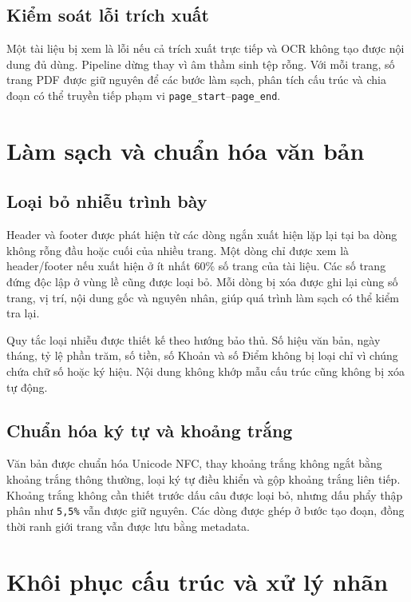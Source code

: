 \documentclass[12pt,a4paper]{article}
\newcommand{\code}[1]{\texttt{#1}}
\begin{document}
\subsection{Kiểm soát lỗi trích xuất}

Một tài liệu bị xem là lỗi nếu cả trích xuất trực tiếp và OCR không tạo được nội
dung đủ dùng. Pipeline dừng thay vì âm thầm sinh tệp rỗng. Với mỗi trang, số trang
PDF được giữ nguyên để các bước làm sạch, phân tích cấu trúc và chia đoạn có thể
truyền tiếp phạm vi \code{page\_start}--\code{page\_end}.

\section{Làm sạch và chuẩn hóa văn bản}

\subsection{Loại bỏ nhiễu trình bày}

Header và footer được phát hiện từ các dòng ngắn xuất hiện lặp lại tại ba dòng
không rỗng đầu hoặc cuối của nhiều trang. Một dòng chỉ được xem là header/footer
nếu xuất hiện ở ít nhất 60\% số trang của tài liệu. Các số trang đứng độc lập ở
vùng lề cũng được loại bỏ. Mỗi dòng bị xóa được ghi lại cùng số trang, vị trí,
nội dung gốc và nguyên nhân, giúp quá trình làm sạch có thể kiểm tra lại.

Quy tắc loại nhiễu được thiết kế theo hướng bảo thủ. Số hiệu văn bản, ngày tháng,
tỷ lệ phần trăm, số tiền, số Khoản và số Điểm không bị loại chỉ vì chúng chứa
chữ số hoặc ký hiệu. Nội dung không khớp mẫu cấu trúc cũng không bị xóa tự động.

\subsection{Chuẩn hóa ký tự và khoảng trắng}

Văn bản được chuẩn hóa Unicode NFC, thay khoảng trắng không ngắt bằng khoảng
trắng thông thường, loại ký tự điều khiển và gộp khoảng trắng liên tiếp. Khoảng
trắng không cần thiết trước dấu câu được loại bỏ, nhưng dấu phẩy thập phân như
\code{5,5\%} vẫn được giữ nguyên. Các dòng được ghép ở bước tạo đoạn, đồng thời
ranh giới trang vẫn được lưu bằng metadata.

\section{Khôi phục cấu trúc và xử lý nhãn}
\end{document}
